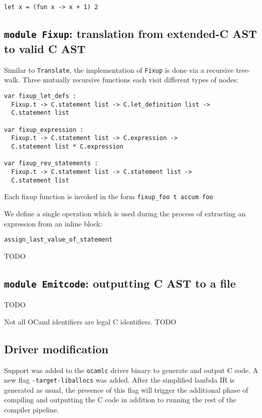 \documentclass[12pt,a4paper,twoside,openright]{report}
\begin{document}
\begin{lstlisting}
let x = (fun x -> x + 1) 2
\end{lstlisting}

\subsection{\texttt{module Fixup}: translation from extended-C AST to valid C AST}\label{module-fixup}

Similar to \lstinline!Translate!, the implementation of \lstinline!Fixup! is
done via a recursive tree-walk. Three mutually recursive functions each visit
different types of nodes:

\begin{lstlisting}
var fixup_let_defs :
  Fixup.t -> C.statement list -> C.let_definition list ->
  C.statement list

var fixup_expression :
  Fixup.t -> C.statement list -> C.expression ->
  C.statement list * C.expression

var fixup_rev_statements :
  Fixup.t -> C.statement list -> C.statement list ->
  C.statement list
\end{lstlisting}

Each fixup function is invoked in the form \lstinline!fixup_foo t accum foo!

We define a single operation which is used during the process of extracting an
expression from an inline block:

\begin{lstlisting}
assign_last_value_of_statement
\end{lstlisting}

TODO

\subsection{\texttt{module Emitcode}: outputting C AST to a file}\label{emitcode}

TODO

Not all OCaml identifiers are legal C identifiers. TODO

\subsection{Driver modification}

Support was added to the \lstinline!ocamlc! driver binary to generate and
output C code. A new flag \lstinline!-target-liballocs! was added. After the
simplified lambda IR is generated as usual, the presence of this flag will
trigger the additional phase of compiling and outputting the C code in addition
to running the rest of the compiler pipeline.
\end{document}
